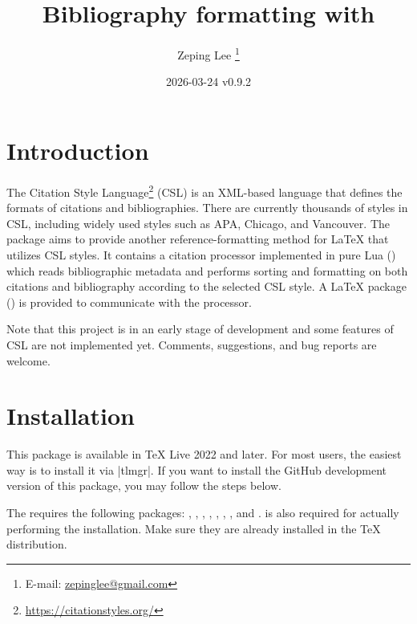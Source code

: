\documentclass{l3doc}
\begin{document}
\title{%
  Bibliography formatting with 
}

\author{%
  Zeping Lee%
  \thanks{%
    E-mail:
    \href{mailto:zepinglee@gmail.com}
      {zepinglee@gmail.com}%
  }%
}

\date{2026-03-24 v0.9.2}

\maketitle


\begin{documentation}

\section{Introduction}

The Citation Style Language\footnote{\url{https://citationstyles.org/}} (CSL)
is an XML-based language that defines the formats of citations and bibliographies.
There are currently thousands of styles in CSL, including widely used styles such as
APA, Chicago, and Vancouver.
The  package aims to provide another reference-formatting method
for LaTeX that utilizes CSL styles.
It contains a citation processor implemented in pure Lua ()
which reads bibliographic metadata and performs sorting and formatting on both
citations and bibliography according to the selected CSL style.
A LaTeX package () is provided to communicate with the processor.

Note that this project is in an early stage of development and some features of CSL
are not implemented yet.
Comments, suggestions, and bug reports are welcome.


\section{Installation}

This package is available in TeX Live 2022 and later.
For most users, the easiest way is to install it via |tlmgr|.
If you want to install the GitHub development version of this package,
you may follow the steps below.

The  requires the following packages:
, , , , ,
, , and .
 is also required for actually performing the installation.
Make sure they are already installed in the TeX distribution.


\end{documentation}
\end{document}
